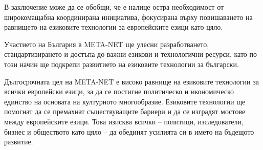 \begin{multicols}{2}
  В заключение може да се обобщи, че е налице остра необходимост от
  широкомащабна координирана инициатива, фокусирана върху повишаването
  на равнището на езиковите технологии за европейските езици като цяло.

  Участието на България в META-NET ще улесни разработването,
  стандартизирането и достъпа до важни езикови и технологични ресурси,
  като по този начин ще подкрепи развитието на езиковите технологии за
  български.

  Дългосрочната цел на META-NET е високо равнище на езиковите технологии
  за всички европейски езици, за да се постигне политическо и
  икономическо единство на основата на културното
  многообразие. Езиковите технологии ще помогнат да се премахнат
  съществуващите бариери и да се изградят мостове между европейските
  езици. Това изисква всички -- политици, изследователи, бизнес и
  обществото като цяло -- да обединят усилията си в името на бъдещото
  развитие.
  \end{multicols}

  \clearpage

